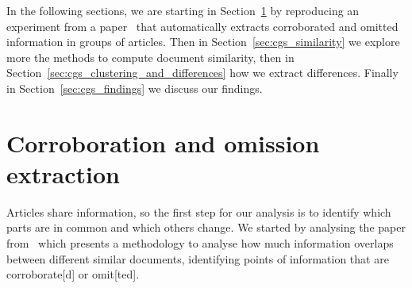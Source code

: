 
In the following sections, we are starting in Section~\ref{sec:cgs_cross_referencing} by reproducing an experiment from a paper~\cite{bountouridis2018explaining} that automatically extracts corroborated and omitted information in groups of articles. Then in Section~\ref{sec:cgs_similarity} we explore more the methods
 to compute document similarity, then in Section~\ref{sec:cgs_clustering_and_differences} how we extract differences. Finally in Section~\ref{sec:cgs_findings} we discuss our findings.

















\section{Corroboration and omission extraction}
\label{sec:cgs_cross_referencing}
Articles share information, so the first step for our analysis is to identify which parts are in common and which others change.
We started by analysing the paper from~\citet{bountouridis2018explaining} which presents a methodology to analyse how much information overlaps between different similar documents, identifying points of information that are \gls{corroborate}[d] or \gls{omit}[ted].

